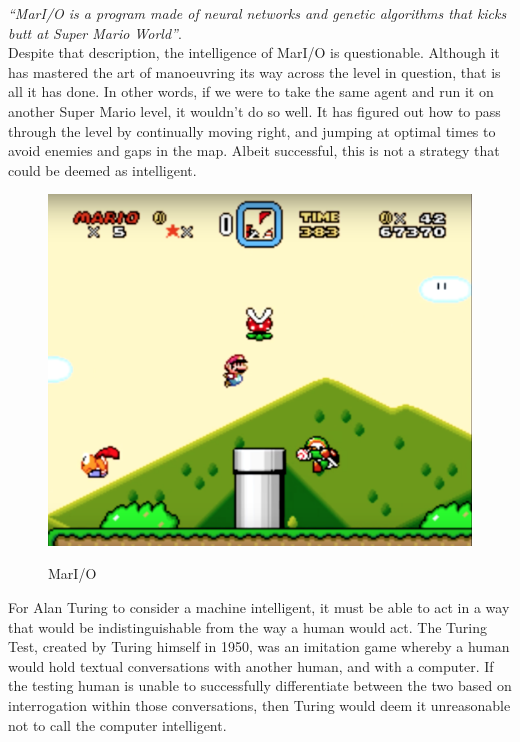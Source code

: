 \documentclass[12pt,a4paper]{article}
\begin{document}
\textit{\enquote{MarI/O is a program made of neural networks and genetic algorithms that kicks butt at Super Mario World}}\citep{MarIO}. \\

Despite that description, the intelligence of MarI/O is questionable. Although it has mastered the art of manoeuvring its way across the level in question, that is all it has done. In other words, if we were to take the same agent and run it on another Super Mario level, it wouldn't do so well. It has figured out how to pass through the level by continually moving right, and jumping at optimal times to avoid enemies and gaps in the map. Albeit successful, this is not a strategy that could be deemed as intelligent. 

\begin{figure}[h]
	\centering
	\includegraphics[width = \textwidth]{MarIO.png}
	\caption{MarI/O}
	\citep{MarIO} 
\end{figure}

For Alan Turing to consider a machine intelligent, it must be able to act in a way that would be indistinguishable from the way a human would act. The Turing Test, created by Turing himself in 1950, was an imitation game whereby a human would hold textual conversations with another human, and with a computer. If the testing human is unable to successfully differentiate between the two based on interrogation within those conversations, then Turing would deem it unreasonable not to call the computer intelligent\citep{TuringTest}.
\end{document}
